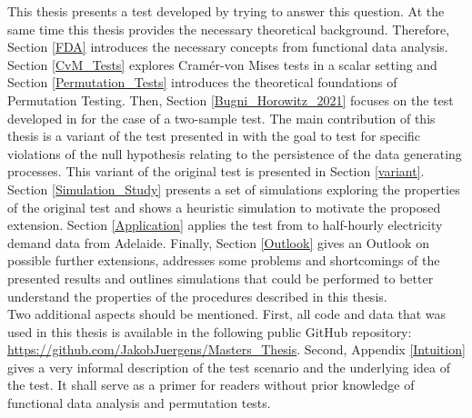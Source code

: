 \documentclass[12pt, a4paper]{article}
\theoremstyle{MAstyle} \newtheorem{assumption}{Assumption}[section]
\theoremstyle{MAstyle} \newtheorem{definition}{Definition}[section]
\theoremstyle{MAstyle} \newtheorem{theorem}{Theorem}[section]
\begin{document}
		This thesis presents a test developed by \cite{bugni_permutation_2021} trying to answer this question. At the same time this thesis provides the necessary theoretical background. Therefore, Section \ref{FDA} introduces the necessary concepts from functional data analysis. 
		Section \ref{CvM_Tests} explores Cram\'{e}r-von Mises tests in a scalar setting and Section \ref{Permutation_Tests} introduces the theoretical foundations of Permutation Testing.
		Then, Section \ref{Bugni_Horowitz_2021} focuses on the test developed in \cite{bugni_permutation_2021} for the case of a two-sample test.
		The main contribution of this thesis is a variant of the test presented in \cite{bugni_permutation_2021} with the goal to test for specific violations of the null hypothesis relating to the persistence of the data generating processes. This variant of the original test is presented in Section \ref{variant}.
		Section \ref{Simulation_Study} presents a set of simulations exploring the properties of the original test and shows a heuristic simulation to motivate the proposed extension. 
		Section \ref{Application} applies the test from \cite{bugni_permutation_2021} to half-hourly electricity demand data from Adelaide.
		Finally, Section \ref{Outlook} gives an Outlook on possible further extensions, addresses some problems and shortcomings of the presented results and outlines simulations that could be performed to better understand the properties of the procedures described in this thesis.\\
		
		Two additional aspects should be mentioned. First, all code and data that was used in this thesis is available in the following public GitHub repository: \url{https://github.com/JakobJuergens/Masters_Thesis}. 
		Second, Appendix \ref{Intuition} gives a very informal description of the test scenario and the underlying idea of the test. It shall serve as a primer for readers without prior knowledge of functional data analysis and permutation tests. 
	
\end{document}
